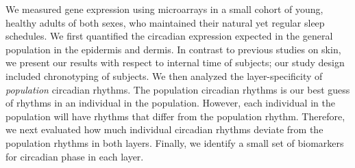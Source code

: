 We measured gene expression using microarrays in a small cohort of young, healthy adults of both sexes, who maintained their natural yet regular sleep schedules. We first quantified the circadian expression expected in the general population in the epidermis and dermis. In contrast to previous studies on skin, we present our results with respect to internal time of subjects; our study design included chronotyping of subjects. We then analyzed the layer-specificity of \textit{population} circadian rhythms. The population circadian rhythms is our best guess of rhythms in an individual in the population. However, each individual in the population will have rhythms that differ from the population rhythm. Therefore, we next evaluated how much individual circadian rhythms deviate from the population rhythms in both layers. Finally, we identify a small set of biomarkers for circadian phase in each layer.



